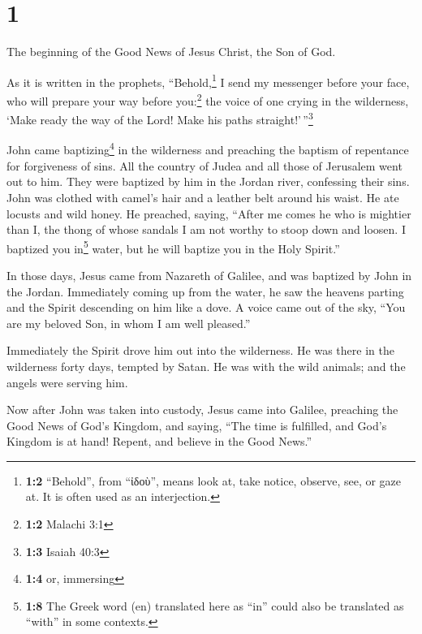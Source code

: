 \hypertarget{section}{%
\section{1}\label{section}}

 The beginning of the Good News of Jesus Christ, the Son
of God.

 As it is written in the prophets, ``Behold,\footnote{\textbf{1:2}
  ``Behold'', from ``ἰδοὺ'', means look at, take notice, observe, see,
  or gaze at. It is often used as an interjection.} I send my messenger
before your face, who will prepare your way before you:\footnote{\textbf{1:2}
  Malachi 3:1}  the voice of one crying in the wilderness,
`Make ready the way of the Lord! Make his paths
straight!'\,''\footnote{\textbf{1:3} Isaiah 40:3}

 John came baptizing\footnote{\textbf{1:4} or, immersing}
in the wilderness and preaching the baptism of repentance for
forgiveness of sins.  All the country of Judea and all
those of Jerusalem went out to him. They were baptized by him in the
Jordan river, confessing their sins.  John was clothed
with camel's hair and a leather belt around his waist. He ate locusts
and wild honey.  He preached, saying, ``After me comes he
who is mightier than I, the thong of whose sandals I am not worthy to
stoop down and loosen.  I baptized you in\footnote{\textbf{1:8}
  The Greek word (en) translated here as ``in'' could also be translated
  as ``with'' in some contexts.} water, but he will baptize you in the
Holy Spirit.''

 In those days, Jesus came from Nazareth of Galilee, and
was baptized by John in the Jordan.  Immediately coming
up from the water, he saw the heavens parting and the Spirit descending
on him like a dove.  A voice came out of the sky, ``You
are my beloved Son, in whom I am well pleased.''

 Immediately the Spirit drove him out into the
wilderness.  He was there in the wilderness forty days,
tempted by Satan. He was with the wild animals; and the angels were
serving him.

 Now after John was taken into custody, Jesus came into
Galilee, preaching the Good News of God's Kingdom,  and
saying, ``The time is fulfilled, and God's Kingdom is at hand! Repent,
and believe in the Good News.''

